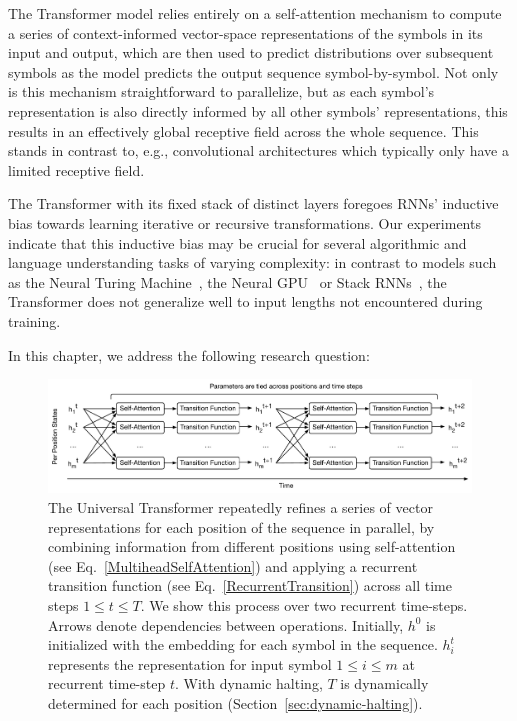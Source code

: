 The Transformer model relies entirely on a self-attention mechanism \citep{decomposableAttnModel,lin2017structured} to compute a series of context-informed vector-space representations of the symbols in its input and output, which are then used to predict distributions over subsequent symbols as the model predicts the output sequence symbol-by-symbol. Not only is this mechanism straightforward to parallelize, but as each symbol's representation is also directly informed by all other symbols' representations, this results in an effectively global receptive field across the whole sequence. This stands in contrast to, e.g.,  convolutional architectures which typically only have a limited receptive field.

The Transformer with its fixed stack of distinct layers foregoes RNNs' inductive bias towards learning iterative or recursive transformations. Our experiments indicate that this inductive bias may be crucial for several algorithmic and language understanding tasks of varying complexity: in contrast to models such as the Neural Turing Machine~\citep{ntm14}, the Neural GPU~\citep{neural_gpu} or Stack RNNs~\citep{stack_rnn}, the Transformer does not generalize well to input lengths not encountered during training. 

In this chapter, we address the following research question:

\begin{figure}
 \centering
 \includegraphics[width=\textwidth]{04-part-03/chapter-06/figs_and_tables/fig_universal-transformer-as-rnn.pdf}
 \caption{The Universal Transformer repeatedly refines a series of vector representations for each position of the sequence in parallel, by combining information from different positions using self-attention (see Eq.~\ref{MultiheadSelfAttention}) and applying a recurrent transition function (see Eq.~\ref{RecurrentTransition}) across all time steps $1 \leq t \leq T$. We show this process over two recurrent time-steps. Arrows denote dependencies between operations. Initially, $h^0$ is initialized with the embedding for each symbol in the sequence. $h^t_i$ represents the representation for input symbol $1 \leq i \leq m$ at recurrent time-step $t$. With dynamic halting, $T$ is dynamically determined for each position (Section~\ref{sec:dynamic-halting}).}
 \label{fig:rec-state}
\end{figure}


